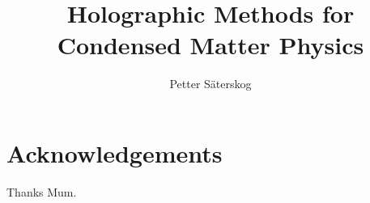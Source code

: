 \documentclass[12pt]{report}
\title{Holographic Methods for Condensed Matter Physics}
\author{Petter Säterskog}
\begin{document}
\maketitle
\section*{Acknowledgements}
Thanks Mum.
\tableofcontents
\end{document}
